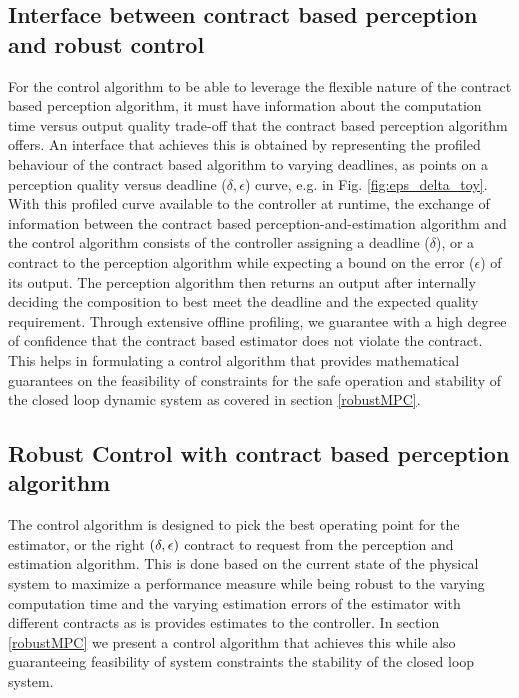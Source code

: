 
\subsection{Interface between contract based perception and robust control}

For the control algorithm to be able to leverage the flexible nature of the contract based perception algorithm, it must have information about the computation time versus output quality trade-off that the contract based perception algorithm offers. An interface that achieves this is obtained by representing the profiled behaviour of the contract based algorithm to varying deadlines, as points on a perception quality versus deadline ($\delta, \epsilon$) curve, e.g. in Fig. \ref{fig:eps_delta_toy}.
With this profiled curve available to the controller at runtime, the exchange of information between the contract based perception-and-estimation algorithm and the control algorithm consists of the controller assigning a deadline ($\delta$), or a contract to the perception algorithm while expecting a bound on the error ($\epsilon$) of its output. The perception algorithm then returns an output after internally deciding the composition to best meet the deadline and the expected quality requirement. 
Through extensive offline profiling, we guarantee with a high degree of confidence that the contract based estimator does not violate the contract. This helps in formulating a control algorithm that provides mathematical guarantees on the feasibility of constraints for the safe operation and stability of the closed loop dynamic system as covered in section \ref{robustMPC}.

\subsection{Robust Control with contract based perception algorithm}

The control algorithm is designed to pick the best operating point for the estimator, or the right $(\delta,\epsilon)$ contract to request from the perception and estimation algorithm. This is done based on the current state of the physical system to maximize a performance measure while being robust to the varying computation time and the varying estimation errors of the estimator with different contracts as is provides estimates to the controller. In section \ref{robustMPC} we present a control algorithm that achieves this while also guaranteeing feasibility of system constraints the stability of the closed loop system.






